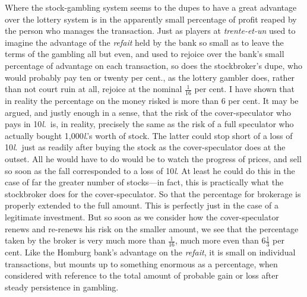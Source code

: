 \documentclass[letterpaper,12pt,oneside,openany]{memoir}
\begin{document}
Where the stock-gambling system seems to the
dupes to have a great advantage over the lottery system
is in the apparently small percentage of profit reaped
by the person who manages the transaction. Just as
players at \textit{trente-et-un} used to imagine the advantage of
the \textit{refait} held by the bank so small as to leave the terms
of the gambling all but even, and used to rejoice over
the bank's small percentage of advantage on each transaction,
so does the stockbroker's dupe, who would
probably pay ten or twenty per cent., as the lottery
gambler does, rather than not court ruin at all, rejoice
at the nominal $\frac{1}{16}$ per cent. I have shown that in
reality the percentage on the money risked is more than
6 per cent. It may be argued, and justly enough in a
sense, that the risk of the cover-speculator who pays in
10\textit{l}.\ is, in reality, precisely the same as the risk of a full
speculator who actually bought 1,000\textit{l}.'s worth of stock.
The latter could stop short of a loss of 10\textit{l}.\ just as
readily after buying the stock as the cover-speculator
does at the outset. All he would have to do would be
to watch the progress of prices, and sell so soon as the
fall corresponded to a loss of 10\textit{l}. At least he could do
this in the case of far the greater number of stocks---in
fact, this is practically what the stockbroker does for
the cover-speculator. So that the percentage for
brokerage is properly extended to the full amount.
This is perfectly just in the case of a legitimate investment.
But so soon as we consider how the cover-speculator
renews and re-renews his risk on the smaller
amount, we see that the percentage taken by the broker
is very much more than $\frac{1}{16}$, much more even than 6$\frac{1}{3}$
per cent. Like the Homburg bank's advantage on the
\textit{refait}, it is small on individual transactions, but mounts
up to something enormous as a percentage, when considered
with reference to the total amount of probable
gain or loss after steady persistence in gambling.
\end{document}
